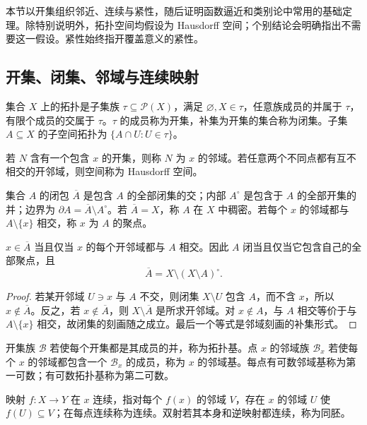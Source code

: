 本节以开集组织邻近、连续与紧性，随后证明函数逼近和类别论中常用的基础定理。除特别说明外，拓扑空间均假设为 Hausdorff 空间；个别结论会明确指出不需要这一假设。紧性始终指开覆盖意义的紧性。

\subsection{开集、闭集、邻域与连续映射}
\begin{definition}[拓扑与子空间拓扑]\label{def:y0-topology}
集合 $X$ 上的拓扑是子集族 $\tau\subseteq\mathcal P(X)$，满足 $\varnothing,X\in\tau$，任意族成员的并属于 $\tau$，有限个成员的交属于 $\tau$。$\tau$ 的成员称为开集，补集为开集的集合称为闭集。子集 $A\subseteq X$ 的子空间拓扑为 $\{A\cap U:U\in\tau\}$。

若 $N$ 含有一个包含 $x$ 的开集，则称 $N$ 为 $x$ 的邻域。若任意两个不同点都有互不相交的开邻域，则空间称为 Hausdorff 空间。
\end{definition}

\begin{definition}[闭包、内部、边界与聚点]\label{def:y0-closure}
集合 $A$ 的闭包 $\overline A$ 是包含 $A$ 的全部闭集的交；内部 $A^\circ$ 是包含于 $A$ 的全部开集的并；边界为 $\partial A=\overline A\setminus A^\circ$。若 $\overline A=X$，称 $A$ 在 $X$ 中稠密。若每个 $x$ 的邻域都与 $A\setminus\{x\}$ 相交，称 $x$ 为 $A$ 的聚点。
\end{definition}

\begin{proposition}[闭包的邻域刻画]\label{prop:y0-closure}
$x\in\overline A$ 当且仅当 $x$ 的每个开邻域都与 $A$ 相交。因此 $A$ 闭当且仅当它包含自己的全部聚点，且
\[
 \overline A=X\setminus(X\setminus A)^\circ.
\]
\end{proposition}
\begin{proof}
若某开邻域 $U\ni x$ 与 $A$ 不交，则闭集 $X\setminus U$ 包含 $A$，而不含 $x$，所以 $x\notin\overline A$。反之，若 $x\notin\overline A$，则 $X\setminus\overline A$ 是所求开邻域。对 $x\notin A$，与 $A$ 相交等价于与 $A\setminus\{x\}$ 相交，故闭集的刻画随之成立。最后一个等式是邻域刻画的补集形式。
\end{proof}

\begin{definition}\label{def:y0-continuity}
开集族 $\mathcal B$ 若使每个开集都是其成员的并，称为拓扑基。点 $x$ 的邻域族 $\mathcal B_x$ 若使每个 $x$ 的邻域都包含一个 $\mathcal B_x$ 的成员，称为 $x$ 的邻域基。每点有可数邻域基称为第一可数；有可数拓扑基称为第二可数。

映射 $f:X\to Y$ 在 $x$ 连续，指对每个 $f(x)$ 的邻域 $V$，存在 $x$ 的邻域 $U$ 使 $f(U)\subseteq V$；在每点连续称为连续。双射若其本身和逆映射都连续，称为同胚。
\end{definition}

